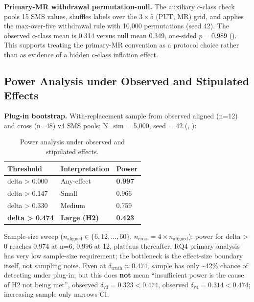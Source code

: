 \documentclass[manuscript,screen,review]{acmart}
\begin{document}
\textbf{Primary-MR withdrawal permutation-null.} The auxiliary c-class
check pools 15 SMS values, shuffles labels over the $3 \times 5$ (PUT,
MR) grid, and applies the max-over-five withdrawal rule with 10,000
permutations (seed 42). The observed c-class mean is 0.314 versus null
mean 0.349, one-sided $p = 0.989$
(). This supports treating
the primary-MR convention as a protocol choice rather than as evidence of
a hidden c-class inflation effect.

\subsection{Power Analysis under Observed and Stipulated Effects}\label{d.3-power-analysis-plug-in-and-stipulated-alternative}

\textbf{Plug-in bootstrap.} With-replacement sample from observed
aligned (n=12) and cross (n=48) v4 SMS pools; N\_sim = 5,000, seed = 42
(, ):

{%
\begin{longtable}[]{@{}lll@{}}
\caption{Power analysis under observed and stipulated effects.}\label{tab:p2-23}\\
\toprule\noalign{}
Threshold & Interpretation & Power \\
\midrule\noalign{}
\endfirsthead
\endhead
\bottomrule\noalign{}
\endlastfoot
delta \textgreater{} 0.000 & Any-effect & \textbf{0.997} \\
delta \textgreater{} 0.147 & Small & 0.966 \\
delta \textgreater{} 0.330 & Medium & 0.759 \\
\textbf{delta \textgreater{} 0.474} & \textbf{Large (H2)} &
\textbf{0.423} \\
\end{longtable}
}

Sample-size sweep ($n_{\mathrm{aligned}} \in \{6, 12, \ldots, 60\}$, $n_{\mathrm{cross}} = 4 \times n_{\mathrm{aligned}}$):
power for delta \textgreater{} 0 reaches 0.974 at n=6, 0.996 at 12,
plateaus thereafter. RQ4 primary analysis has very low sample-size
requirement; the bottleneck is the effect-size boundary itself, not
sampling noise. Even at $\delta_{\mathrm{truth}} \approx 0.474$, sample has only
\textasciitilde42\% chance of detecting under plug-in; but this does
\textbf{not} mean ``insufficient power is the cause of H2 not being
met'', observed $\delta_{\mathrm{v3}} = 0.323 < 0.474$, observed
$\delta_{\mathrm{v4}} = 0.314 < 0.474$; increasing sample only narrows CI.
\end{document}
